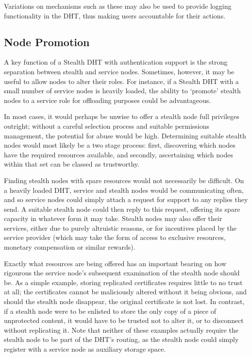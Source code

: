 \documentclass{elsart3p}
\begin{document}
Variations on mechanisms such as these may also be used to provide
logging functionality in the DHT, thus making users accountable for
their actions.

\subsection{Node Promotion}
A key function of a Stealth DHT with authentication support is the
strong separation between stealth and service nodes. Sometimes,
however, it may be useful to allow nodes to alter their roles. For
instance, if a Stealth DHT with a small number of service nodes is
heavily loaded, the ability to `promote' stealth nodes to a service
role for offloading purposes could be advantageous.

In most cases, it would perhaps be unwise to offer a stealth node
full privileges outright; without a careful selection process and
suitable permissions management, the potential for abuse would be
high. Determining suitable stealth nodes would most likely be a two
stage process: first, discovering which nodes have the required
resources available, and secondly, ascertaining which nodes within
that set can be classed as trustworthy.

Finding stealth nodes with spare resources would not necessarily be
difficult. On a heavily loaded DHT, service and stealth nodes would
be communicating often, and so service nodes could simply attach a
request for support to any replies they send. A suitable stealth
node could then reply to this request, offering its spare capacity
in whatever form it may take. Stealth nodes may also offer their
services, either due to purely altruistic reasons, or for incentives
placed by the service provider (which may take the form of access to
exclusive resources, monetary compensation or similar rewards).

Exactly what resources are being offered has an important bearing on
how rigourous the service node's subsequent examination of the
stealth node should be. As a simple example, storing replicated
certificates requires little to no trust at all; the certificates
cannot be maliciously altered without it being obvious, and should
the stealth node disappear, the original certificate is not lost. In
contrast, if a stealth node were to be enlisted to store the only
copy of a piece of unprotected content, it would have to be trusted
not to alter it, or to disconnect without replicating it. Note that
neither of these examples actually require the stealth node to be
part of the DHT's routing, as the stealth node could simply register
with a service node as auxiliary storage space.
\end{document}
